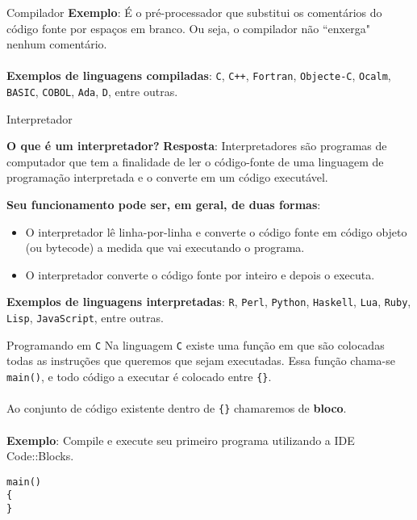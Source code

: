 \documentclass{beamer}
\newcommand{\C}{\texttt{C}}
\begin{document}
\begin{frame}{Compilador}
\textbf{Exemplo}: É o pré-processador que substitui os comentários do código fonte por espaços em branco. Ou seja, o compilador não ``enxerga" nenhum comentário.\\~\\
\textbf{Exemplos de linguagens compiladas}: \texttt{C}, \texttt{C++}, \texttt{Fortran}, \texttt{Objecte-C}, \texttt{Ocalm}, \texttt{BASIC}, \texttt{COBOL}, \texttt{Ada}, \texttt{D}, entre outras.
\end{frame}

\begin{frame}{Interpretador}
\begin{block}{\textbf{O que é um interpretador?}}
\textbf{Resposta}: Interpretadores são programas de computador que tem a finalidade  de ler o código-fonte de uma linguagem de programação interpretada e o converte em um código executável.
\end{block}
\vspace{0.3cm}
\pause \textbf{Seu funcionamento pode ser, em geral, de duas formas}:
\begin{itemize}
	\item O interpretador lê linha-por-linha e converte o código fonte em código objeto (ou bytecode) a medida que vai executando o programa.
	\pause \item O interpretador converte o código fonte por inteiro e depois o executa.
\end{itemize}
\pause \textbf{Exemplos de linguagens interpretadas}: \texttt{R}, \texttt{Perl}, \texttt{Python}, \texttt{Haskell}, \texttt{Lua}, \texttt{Ruby}, \texttt{Lisp}, \texttt{JavaScript}, entre outras.
\end{frame}

\begin{frame}[fragile]{Programando em \C}
Na linguagem \texttt{C} existe uma função em que são colocadas todas as instruções que queremos que sejam executadas. Essa função chama-se \texttt{main()}, e todo código a executar é colocado entre \texttt{\{\}}.\\~\\

Ao conjunto de código existente dentro de \texttt{\{\}} chamaremos de \textbf{bloco}.\\~\\

\textbf{Exemplo}: Compile e execute seu primeiro programa utilizando a IDE Code::Blocks.
\begin{verbatim}
main()
{
}
\end{verbatim}
\end{frame}
\end{document}
